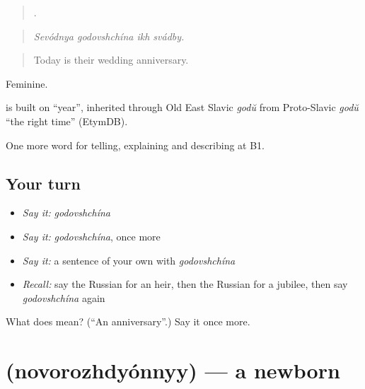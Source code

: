 \begin{quote}
   .
\end{quote}

\begin{quote}
\emph{Sevódnya godovshchína ikh svádby.}
\end{quote}

\begin{quote}
Today is their wedding anniversary.
\end{quote}

Feminine.

\begin{cousinweb}
\emph{} is built on \emph{} \textquotedblleft{}year\textquotedblright{}, inherited through Old East Slavic \emph{godŭ} from Proto-Slavic \emph{godŭ} \textquotedblleft{}the right time\textquotedblright{} (EtymDB).
\end{cousinweb}

\begin{grammarlens}[title={What you've built}]
One more word for telling, explaining and describing at B1.
\end{grammarlens}

\subsection*{Your turn}
\begin{itemize}
\raggedright
  \item \emph{Say it:} \emph{godovshchína}
  \item \emph{Say it:} \emph{godovshchína}, once more
  \item \emph{Say it:} a sentence of your own with \emph{godovshchína}
  \item \emph{Recall:} say the Russian for an heir, then the Russian for a jubilee, then say \emph{godovshchína} again
\end{itemize}

\begin{tcolorbox}[breakable,colback=teal!4,colframe=teal!35!black,title={Before you move on}]
What does  mean? (\textquotedblleft{}An anniversary\textquotedblright{}.) Say it once more.
\end{tcolorbox}
\section[\texorpdfstring{\ru{новорождённый} (novorozhdyónnyy)}{новорождённый (novorozhdyónnyy)}]{ (novorozhdyónnyy) — a newborn}

